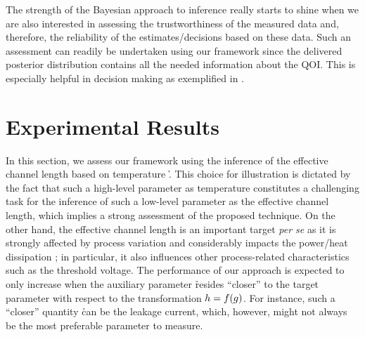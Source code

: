 The strength of the Bayesian approach to inference really starts to shine when
we are also interested in assessing the trustworthiness of the measured data
and, therefore, the reliability of the estimates/decisions based on these data.
Such an assessment can readily be undertaken using our framework since the
delivered posterior distribution contains all the needed information about the
\ac{QOI}. This is especially helpful in decision making as exemplified in
.

\section{Experimental Results}

In this section, we assess our framework using the inference of the effective
channel length \g based on temperature \h. This choice for illustration is
dictated by the fact that such a high-level parameter as temperature constitutes
a challenging task for the inference of such a low-level parameter as the
effective channel length, which implies a strong assessment of the proposed
technique. On the other hand, the effective channel length is an important
target \emph{per se} as it is strongly affected by process variation and
considerably impacts the power/heat dissipation \cite{chandrakasan2000,
srivastava2010, juan2012}; in particular, it also influences other
process-related characteristics such as the threshold voltage. The performance
of our approach is expected to only increase when the auxiliary parameter \h
resides ``closer'' to the target parameter \g with respect to the transformation
$h = f(g)$. For instance, such a ``closer'' quantity \h can be the leakage
current, which, however, might not always be the most preferable parameter to
measure.

